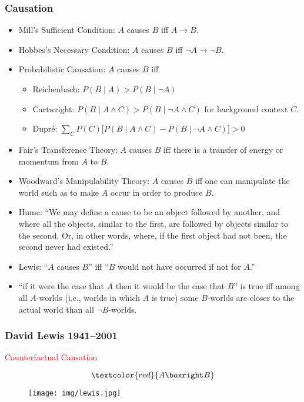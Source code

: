 \documentclass[UTF8,11pt,colorlinks,compress,openany]{beamer}%
\begin{document}
\begin{frame}\frametitle{Causation}
\vspace*{-1ex}
\begin{itemize}
	\item Mill's Sufficient Condition: $A$ causes $B$ iff $A\to B$.
	\item Hobbes's Necessary Condition: $A$ causes $B$ iff $\neg A\to\neg B$.
	\item Probabilistic Causation: $A$ causes $B$ iff 
	\begin{itemize}
		\item Reichenbach: $P(B\mid A)>P(B\mid \neg A)$
		\item Cartwright: $P(B\mid A\wedge C)>P(B\mid \neg A\wedge C)$ for background context $C$.
		\item Dupr\'e: $\sum_C P(C)\big[P(B\mid A\wedge C)-P(B\mid \neg A\wedge C)\big]>0$
	\end{itemize}
	\item Fair's Transference Theory: $A$ causes $B$ iff there is a transfer of energy or momentum from $A$ to $B$.
	\item Woodward's Manipulability Theory: $A$ causes $B$ iff one can manipulate the world such as to make $A$ occur in order to produce $B$.
	\item Hume:	``We may define a cause to be an object followed by another, and where all the objects, similar to the first, are followed by objects similar to the second. Or, in other words, where, if the first object had not been, the second never had existed.''
	\item Lewis: ``$A$ causes $B$'' iff ``$B$ would not have occurred if not for $A$.''
	\item ``if it were the case that $A$ then it would be 		the case that $B$'' is true iff among all $A$-worlds (i.e., worlds in which $A$ is true) some $B$-worlds are closer to the actual world than all $\neg B$-worlds.
\end{itemize}
\end{frame}

\begin{frame}\frametitle{David Lewis 1941–2001}
\centerline{\textcolor{red}{Counterfactual Causation}}
\[\textcolor{red}{A\boxright B}\]
\begin{figure}[H]
\texttt{[image: img/lewis.jpg]}	
\end{figure}
\end{frame}
\end{document}
